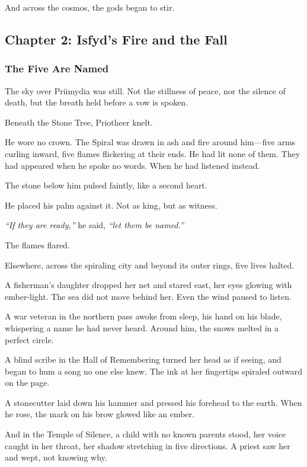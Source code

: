 \documentclass[12pt]{article}
\begin{document}
And across the cosmos, the gods began to stir.

\newpage

\subsection*{Chapter 2: Isfyd's Fire and the Fall}

\vspace{.5in}

\subsubsection*{The Five Are Named}

The sky over Priimydia was still. Not the stillness of peace, nor the silence of death, but the breath held before a vow is spoken.

Beneath the Stone Tree, Priotheer knelt.

He wore no crown. The Spiral was drawn in ash and fire around him—five arms curling inward, five flames flickering at their ends. He had lit none of them. They had appeared when he spoke no words. When he had listened instead.

The stone below him pulsed faintly, like a second heart.

He placed his palm against it. Not as king, but as witness.

\emph{``If they are ready,''} he said, \emph{``let them be named.''}

The flames flared.

Elsewhere, across the spiraling city and beyond its outer rings, five lives halted.

A fisherman's daughter dropped her net and stared east, her eyes glowing with ember-light. The sea did not move behind her. Even the wind paused to listen.

A war veteran in the northern pass awoke from sleep, his hand on his blade, whispering a name he had never heard. Around him, the snows melted in a perfect circle.

A blind scribe in the Hall of Remembering turned her head as if seeing, and began to hum a song no one else knew. The ink at her fingertips spiraled outward on the page.

A stonecutter laid down his hammer and pressed his forehead to the earth. When he rose, the mark on his brow glowed like an ember.

And in the Temple of Silence, a child with no known parents stood, her voice caught in her throat, her shadow stretching in five directions. A priest saw her and wept, not knowing why.
\end{document}
